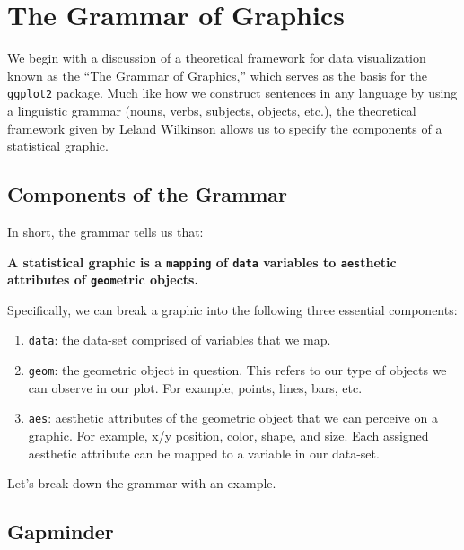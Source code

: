 \documentclass[12pt,]{krantz}
\providecommand{\tightlist}{%
  \setlength{\itemsep}{0pt}\setlength{\parskip}{0pt}}
\renewenvironment{quote}{\begin{VF}}{\end{VF}}
\begin{document}
\section{The Grammar of Graphics}\label{grammarofgraphics}

We begin with a discussion of a theoretical framework for data
visualization known as the ``The Grammar of Graphics,'' which serves as
the basis for the \texttt{ggplot2} package. Much like how we construct
sentences in any language by using a linguistic grammar (nouns, verbs,
subjects, objects, etc.), the theoretical framework given by Leland
Wilkinson \citep{wilkinson2005} allows us to specify the components of a
statistical graphic.

\subsection{Components of the Grammar}\label{components-of-the-grammar}

In short, the grammar tells us that:

\begin{quote}
\textbf{A statistical graphic is a \texttt{mapping} of \texttt{data}
variables to \texttt{aes}thetic attributes of \texttt{geom}etric
objects.}
\end{quote}

Specifically, we can break a graphic into the following three essential
components:

\begin{enumerate}
\def\labelenumi{\arabic{enumi}.}
\tightlist
\item
  \texttt{data}: the data-set comprised of variables that we map.
\item
  \texttt{geom}: the geometric object in question. This refers to our
  type of objects we can observe in our plot. For example, points,
  lines, bars, etc.
\item
  \texttt{aes}: aesthetic attributes of the geometric object that we can
  perceive on a graphic. For example, x/y position, color, shape, and
  size. Each assigned aesthetic attribute can be mapped to a variable in
  our data-set.
\end{enumerate}

Let's break down the grammar with an example.

\subsection{Gapminder}\label{gapminder}
\end{document}
